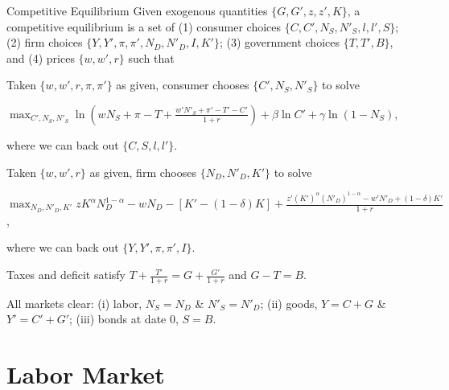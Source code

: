 \documentclass[11pt,aspectratio=169,usenames,dvipsnames]{beamer}
\let\tempa\enumerate
\let\tempb\endenumerate
\renewenvironment{enumerate}{\tempa\addtolength{\itemsep}{\fill}}{\tempb}
\begin{document}
\begin{frame}{Competitive Equilibrium}
\label{slide:Competitive_Equilibrium}
    \scriptsize
    Given exogenous quantities $ \{ G, G', z, z', K \} $, a competitive equilibrium is a set of (1) consumer choices $ \{ C, C', N_{S}, N'_{S}, l, l', S \} $; (2) firm choices $ \{ Y, Y', \pi, \pi', N_{D}, N'_{D}, I, K' \} $; (3) government choices $ \{ T, T', B \} $, and (4) prices $ \{ w, w', r \} $ such that
    \begin{enumerate}
        \item Taken $ \{ w, w', r, \pi, \pi' \} $ as given, consumer chooses $ \{ C', N_{S}, N'_{S} \} $ to solve
            \begin{center}
                $
                \displaystyle
                \max_{C', N_{S}, N'_{S}} \ln \left(
                    w N_{S} + \pi - T +
                    \frac{w' N'_{S} + \pi' - T' - C'}{1+r}
                \right) + \beta \ln C' + \gamma \ln ( 1-N_{S} )
                $,
            \end{center}
            where we can back out $ \{ C, S, l, l' \} $.
        \item Taken $ \{ w, w', r \} $ as given, firm chooses $ \{ N_{D}, N'_{D}, K' \} $ to solve
            \begin{center}
                $
                \displaystyle
                \max_{N_{D}, N'_{D}, K'} z K^{\alpha} N_{D}^{1-\alpha} - w N_{D} - [ K' - ( 1-\delta ) K ] + \frac{z' ( K' )^{\alpha}( N'_{D} )^{1-\alpha} - w' N'_{D} + ( 1-\delta ) K'}{1+r}
                $,
            \end{center}
            where we can back out $ \{ Y, Y', \pi, \pi', I \} $.
        \item Taxes and deficit satisfy $ \displaystyle T + \frac{T'}{1+r} = G + \frac{G'}{1+r} $ and $ G - T = B $.
        \item All markets clear: (i) labor, $ N_{S} = N_{D} $ \& $ N'_{S} = N'_{D} $; (ii) goods, $ Y = C + G $ \& $Y' = C' + G' $; (iii) bonds at date 0, $ S = B $.
    \end{enumerate}
\end{frame}

\section{Labor Market}
\label{sec:Labor_Market}
\end{document}
